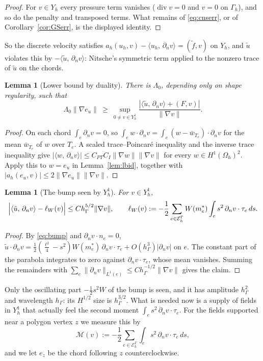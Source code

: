 \documentclass[pdflatex,sn-mathphys-num]{sn-jnl}
\theoremstyle{thmstyleone}
\newtheorem{lemma}[theorem]{Lemma}
\theoremstyle{thmstylethree}
\newcommand{\hG}{h_\Gamma}
\newcommand{\Gh}{\Gamma_h}
\newcommand{\Oh}{\Omega_h}
\newcommand{\EG}{\mathcal E_h^\Gamma}
\newcommand{\Yh}{Y_h}
\newcommand{\dn}{\partial_n}
\newcommand{\ut}{\tilde u}
\newcommand{\ft}{\tilde f}
\newcommand{\ip}[2]{\langle #1,\, #2\rangle}
\newcommand{\norm}[1]{\lVert #1\rVert}
\renewcommand{\div}{\operatorname{div}}
\begin{document}
\begin{proof}
For $v\in\Yh$ every pressure term vanishes ($\div v=0$ and $v=0$ on $\Gh$), and so do the penalty and transposed terms. What remains of \eqref{eq:cnserr}, or of Corollary~\ref{cor:GSerr}, is the displayed identity.
\end{proof}

So the discrete velocity satisfies $a_h(u_h,v)-\ip{u_h}{\dn v}=(\ft,v)$ on $\Yh$, and $\ut$ violates this by $-\ip{\ut}{\dn v}$: Nitsche's symmetric term applied to the nonzero trace of $\ut$ on the chords.

\begin{lemma}[Lower bound by duality]\label{lem:lbabs}
There is $\Lambda_0$, depending only on shape regularity, such that
\[
\Lambda_0\norm{\nabla e_u}\ \ge\ \sup_{0\ne v\in\Yh^1}\frac{|\ip{\ut}{\dn v}+(F,v)|}{\norm{\nabla v}} .
\]
\end{lemma}

\begin{proof}
On each chord $\int_e\dn v=0$, so $\int_ew\cdot\dn v=\int_e(w-\bar w_{T_e})\cdot\dn v$ for the mean $\bar w_{T_e}$ of $w$ over $T_e$. A scaled trace--Poincar\'e inequality and the inverse trace inequality give $|\ip{w}{\dn v}|\le C_{PT}C_I\norm{\nabla w}\norm{\nabla v}$ for every $w\in H^1(\Oh)^2$. Apply this to $w=e_u$ in Lemma~\ref{lem:lbid}, together with $|a_h(e_u,v)|\le2\norm{\nabla e_u}\norm{\nabla v}$.
\end{proof}

\begin{lemma}[The bump seen by $\Yh^1$]\label{lem:lbexp}
For $v\in\Yh^1$,
\[
\Bigl|\ip{\ut}{\dn v}-\ell_W(v)\Bigr|\le C\hG^{5/2}\norm{\nabla v},\qquad \ell_W(v):=-\frac12\sum_{e\in\EG}W(m_e^\ast)\int_e s^2\,\dn v\cdot\tau_e\,ds .
\]
\end{lemma}

\begin{proof}
By \eqref{eq:bump} and $\dn v\cdot n_e=0$, $\ut\cdot\dn v=\frac12(\frac{\ell^2}4-s^2)W(m_e^\ast)\,\dn v\cdot\tau_e+O(\hG^3)|\dn v|$ on $e$. The constant part of the parabola integrates to zero against $\dn v\cdot\tau_e$, whose mean vanishes. Summing the remainders with $\sum_e\norm{\dn v}_{L^1(e)}\le C\hG^{-1/2}\norm{\nabla v}$ gives the claim.
\end{proof}

Only the oscillating part $-\frac12s^2W$ of the bump is seen, and it has amplitude $\hG^2$ and wavelength $\hG$: its $H^{1/2}$ size is $\hG^{3/2}$. What is needed now is a supply of fields in $\Yh^1$ that actually feel the second moment $\int_es^2\,\dn v\cdot\tau_e$. For the fields supported near a polygon vertex $z$ we measure this by
\[
\mathcal M(v):=-\frac12\sum_{e\in\EG}\int_e s^2\,\dn v\cdot\tau_e\,ds ,
\]
and we let $e_z$ be the chord following $z$ counterclockwise.
\end{document}

